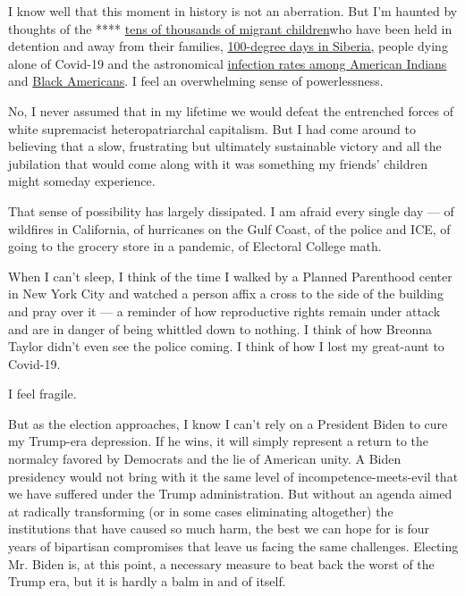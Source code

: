 I know well that this moment in history is not an aberration. But I'm
haunted by thoughts of the ****
\href{https://www.aljazeera.com/news/2019/11/held-record-69550-migrant-children-custody-2019-report-191112132803440.html}{tens
of thousands of migrant children}who have been held in detention and
away from their families,
\href{https://www.cbsnews.com/news/arctic-temperature-record-100-4-degrees-earth-warmest-12000-years/\#:~:text=Tahlequah\%20The\%20Orca-,100.4\%20degree\%20Arctic\%20temperature\%20record\%20confirmed\%20as\%20study\%20suggests\%20Earth,in\%20at\%20least\%2012\%2C000\%20years\&text=Less\%20than\%20two\%20weeks\%20ago,Arctic\%20and\%20alarming\%20meteorologists\%20worldwide.}{100-degree
days in Siberia,} people dying alone of Covid-19 and the astronomical
\href{https://www.cdc.gov/media/releases/2020/p0819-covid-19-impact-american-indian-alaska-native.html}{infection
rates among American Indians} and
\href{https://www.cdc.gov/coronavirus/2019-ncov/covid-data/investigations-discovery/hospitalization-death-by-race-ethnicity.html}{Black
Americans}. I feel an overwhelming sense of powerlessness.

No, I never assumed that in my lifetime we would defeat the entrenched
forces of white supremacist heteropatriarchal capitalism. But I had come
around to believing that a slow, frustrating but ultimately sustainable
victory and all the jubilation that would come along with it was
something my friends' children might someday experience.

That sense of possibility has largely dissipated. I am afraid every
single day --- of wildfires in California, of hurricanes on the Gulf
Coast, of the police and ICE, of going to the grocery store in a
pandemic, of Electoral College math.

When I can't sleep, I think of the time I walked by a Planned Parenthood
center in New York City and watched a person affix a cross to the side
of the building and pray over it --- a reminder of how reproductive
rights remain under attack and are in danger of being whittled down to
nothing. I think of how Breonna Taylor didn't even see the police
coming. I think of how I lost my great-aunt to Covid-19.

I feel fragile.

But as the election approaches, I know I can't rely on a President Biden
to cure my Trump-era depression. If he wins, it will simply represent a
return to the normalcy favored by Democrats and the lie of American
unity. A Biden presidency would not bring with it the same level of
incompetence-meets-evil that we have suffered under the Trump
administration. But without an agenda aimed at radically transforming
(or in some cases eliminating altogether) the institutions that have
caused so much harm, the best we can hope for is four years of
bipartisan compromises that leave us facing the same challenges.
Electing Mr. Biden is, at this point, a necessary measure to beat back
the worst of the Trump era, but it is hardly a balm in and of itself.

